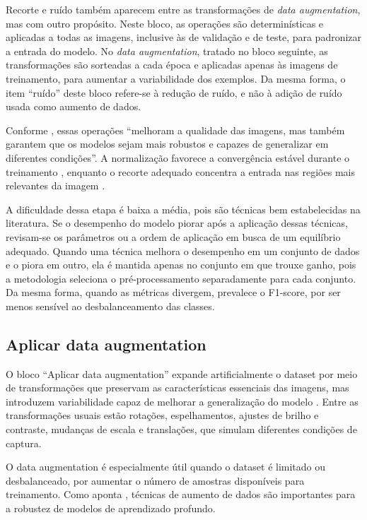 Recorte e ruído também aparecem entre as transformações de \textit{data augmentation}, mas com outro propósito. Neste bloco, as operações são determinísticas e aplicadas a todas as imagens, inclusive às de validação e de teste, para padronizar a entrada do modelo. No \textit{data augmentation}, tratado no bloco seguinte, as transformações são sorteadas a cada época e aplicadas apenas às imagens de treinamento, para aumentar a variabilidade dos exemplos. Da mesma forma, o item ``ruído'' deste bloco refere-se à redução de ruído, e não à adição de ruído usada como aumento de dados.

Conforme , essas operações ``melhoram a qualidade das imagens, mas também garantem que os modelos sejam mais robustos e capazes de generalizar em diferentes condições''. A normalização favorece a convergência estável durante o treinamento \cite{sharma2024deep}, enquanto o recorte adequado concentra a entrada nas regiões mais relevantes da imagem \cite{sciencedirect2023normalization}.

A dificuldade dessa etapa é baixa a média, pois são técnicas bem estabelecidas na literatura. Se o desempenho do modelo piorar após a aplicação dessas técnicas, revisam-se os parâmetros ou a ordem de aplicação em busca de um equilíbrio adequado. Quando uma técnica melhora o desempenho em um conjunto de dados e o piora em outro, ela é mantida apenas no conjunto em que trouxe ganho, pois a metodologia seleciona o pré-processamento separadamente para cada conjunto. Da mesma forma, quando as métricas divergem, prevalece o F1-score, por ser menos sensível ao desbalanceamento das classes.

\subsection{Aplicar data augmentation}
O bloco ``Aplicar data augmentation'' expande artificialmente o dataset por meio de transformações que preservam as características essenciais das imagens, mas introduzem variabilidade capaz de melhorar a generalização do modelo \cite{shorten2019survey}. Entre as transformações usuais estão rotações, espelhamentos, ajustes de brilho e contraste, mudanças de escala e translações, que simulam diferentes condições de captura.

O data augmentation é especialmente útil quando o dataset é limitado ou desbalanceado, por aumentar o número de amostras disponíveis para treinamento. Como aponta , técnicas de aumento de dados são importantes para a robustez de modelos de aprendizado profundo.

